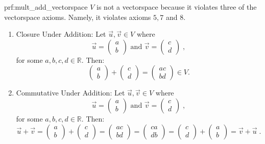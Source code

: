 \begin{prf}{prf:mult_add_vectorspace} %
$V$ is not a vectorspace because it violates three of the vectorspace axioms. Namely, it violates axioms $5,7$ and $8.$
\begin{enumerate}
    \item Closure Under Addition: Let $\vec{u}, \vec{v} \in V$ where $$ \vec{u} = \begin{pmatrix}
a \\
b
\end{pmatrix} \text{ and } \vec{v} = \begin{pmatrix}
c \\
d
\end{pmatrix}\;,$$
for some $a,b,c,d \in \mathbb{R}.$
Then:
$$\begin{pmatrix}
a \\
b
\end{pmatrix} + \begin{pmatrix}
c \\
d
\end{pmatrix} = \begin{pmatrix}
ac \\
bd
\end{pmatrix} \in V.$$
\item Commutative Under Addition: Let $\vec{u}, \vec{v} \in V$ where $$ \vec{u} = \begin{pmatrix}
a \\
b
\end{pmatrix} \text{ and } \vec{v} = \begin{pmatrix}
c \\
d
\end{pmatrix}\;,$$
for some $a,b,c,d \in \mathbb{R}.$
Then:
$$\vec{u} + \vec{v} = \begin{pmatrix}
a \\
b
\end{pmatrix} + \begin{pmatrix}
c \\
d
\end{pmatrix} = \begin{pmatrix}
ac \\
bd
\end{pmatrix} = \begin{pmatrix}
ca \\
db
\end{pmatrix} = \begin{pmatrix}
c \\
d
\end{pmatrix} + \begin{pmatrix}
a \\
b
\end{pmatrix} = \vec{v} + \vec{u}\;.$$


\end{enumerate}
\end{prf}
